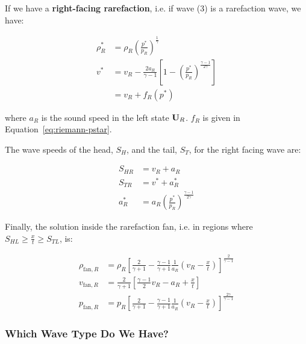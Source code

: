 If we have a \textbf{right-facing rarefaction}, i.e. if wave (3) is a
rarefaction wave, we have:

\begin{align}
\rho^*_R &=
	\rho_R \left( \frac{p^*}{p_R} \right) ^ \frac{1}{\gamma}\\
v^* &=
	v_R - \frac{2 a_R}{\gamma - 1}
	\left[
		1 - \left( \frac{p^*}{p_R} \right) ^ \frac{\gamma - 1}{2 \gamma}
	\right]\\
	&= v_R + f_R(p^*)
\end{align}

where $a_R$ is the sound speed in the left state $\mathbf{U}_R$.
$f_R$ is given in Equation~\ref{eq:riemann-pstar}.





The wave speeds of the head, $S_H$, and the tail, $S_T$, for the right facing
wave are:

\begin{align}
	S_{HR} &= v_R + a_R\\
	S_{TR} &= v^* + a^*_R\\
	a^*_R  &= a_R \left( \frac{p^*}{p_R} \right) ^ \frac{\gamma - 1}{2 \gamma}
\end{align}




Finally, the solution inside the rarefaction fan, i.e. in regions where $S_{HL}
\geq \frac{x}{t} \geq S_{TL}$, is:

\begin{align}
\rho_{\text{fan}, R} &=
	\rho_R \left[
		\frac{2}{\gamma + 1} -
		\frac{\gamma - 1}{\gamma + 1}
		\frac{1}{a_R}
		\left(v_R - \frac{x}{t}\right)
	\right] ^ \frac{2}{\gamma -1 }
	\label{eq:rho-rarefaction-fan-right}\\
v_{\text{fan}, R} &=
	\frac{2}{\gamma + 1}
	\left[
		\frac{\gamma - 1}{2} v_R - a_R + \frac{x}{t}
	\right] \\
p_{\text{fan}, R} &=
	p_R
	\left[
		\frac{2}{\gamma + 1} -
		\frac{\gamma - 1}{\gamma + 1}
		\frac{1}{a_R}
		\left(v_R - \frac{x}{t}\right)
	\right] ^ \frac{2 \gamma}{\gamma -1}
	\label{eq:pressure-rarefaction-fan-right}
\end{align}












\subsubsection{Which Wave Type Do We Have?}


